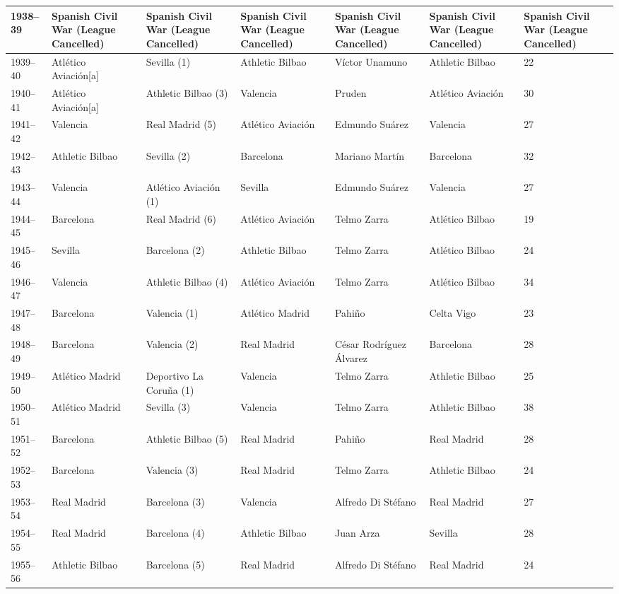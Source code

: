 \documentclass[]{tufte-handout}
\begin{document}
\begin{table}
\begin{tabular}{l|l|l|l|l|l|l}
\hline
1938–39 & Spanish Civil War (League Cancelled) & Spanish Civil War (League Cancelled) & Spanish Civil War (League Cancelled) & Spanish Civil War (League Cancelled) & Spanish Civil War (League Cancelled) & Spanish Civil War (League Cancelled)\\
\hline
1939–40 & Atlético Aviación[a] & Sevilla (1) & Athletic Bilbao & Víctor Unamuno & Athletic Bilbao & 22\\
\hline
1940–41 & Atlético Aviación[a] & Athletic Bilbao (3) & Valencia & Pruden & Atlético Aviación & 30\\
\hline
1941–42 & Valencia & Real Madrid (5) & Atlético Aviación & Edmundo Suárez & Valencia & 27\\
\hline
1942–43 & Athletic Bilbao & Sevilla (2) & Barcelona & Mariano Martín & Barcelona & 32\\
\hline
1943–44 & Valencia & Atlético Aviación (1) & Sevilla & Edmundo Suárez & Valencia & 27\\
\hline
1944–45 & Barcelona & Real Madrid (6) & Atlético Aviación & Telmo Zarra & Atlético Bilbao & 19\\
\hline
1945–46 & Sevilla & Barcelona (2) & Athletic Bilbao & Telmo Zarra & Atlético Bilbao & 24\\
\hline
1946–47 & Valencia & Athletic Bilbao (4) & Atlético Aviación & Telmo Zarra & Atlético Bilbao & 34\\
\hline
1947–48 & Barcelona & Valencia (1) & Atlético Madrid & Pahiño & Celta Vigo & 23\\
\hline
1948–49 & Barcelona & Valencia (2) & Real Madrid & César Rodríguez Álvarez & Barcelona & 28\\
\hline
1949–50 & Atlético Madrid & Deportivo La Coruña (1) & Valencia & Telmo Zarra & Athletic Bilbao & 25\\
\hline
1950–51 & Atlético Madrid & Sevilla (3) & Valencia & Telmo Zarra & Athletic Bilbao & 38\\
\hline
1951–52 & Barcelona & Athletic Bilbao (5) & Real Madrid & Pahiño & Real Madrid & 28\\
\hline
1952–53 & Barcelona & Valencia (3) & Real Madrid & Telmo Zarra & Athletic Bilbao & 24\\
\hline
1953–54 & Real Madrid & Barcelona (3) & Valencia & Alfredo Di Stéfano & Real Madrid & 27\\
\hline
1954–55 & Real Madrid & Barcelona (4) & Athletic Bilbao & Juan Arza & Sevilla & 28\\
\hline
1955–56 & Athletic Bilbao & Barcelona (5) & Real Madrid & Alfredo Di Stéfano & Real Madrid & 24\\

\end{tabular}
\end{table}
\end{document}
